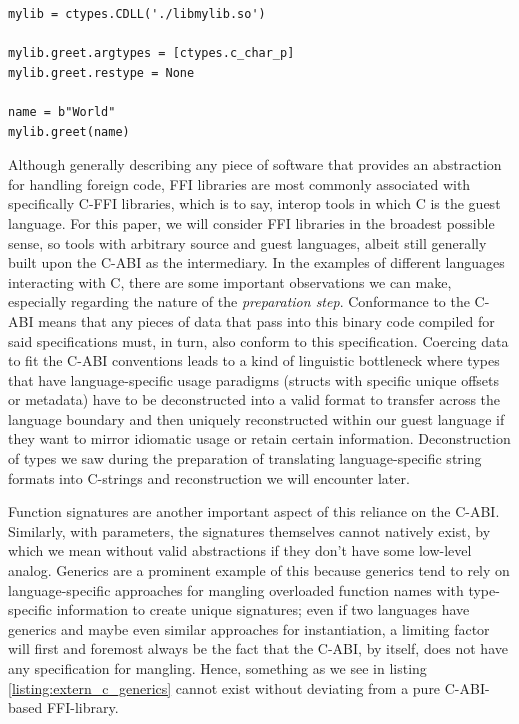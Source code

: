 \begin{listing}[ht!]
\begin{verbatim}
mylib = ctypes.CDLL('./libmylib.so')

mylib.greet.argtypes = [ctypes.c_char_p]
mylib.greet.restype = None

name = b"World"
mylib.greet(name)
\end{verbatim}
  \caption{FFI Example in Python using the cffi library}
  \label{listing:ffi_example_python}
\end{listing}

Although generally describing any piece of software that provides an abstraction for handling foreign code, FFI libraries are most commonly associated with specifically C-FFI libraries, which is to say, interop tools in which C is the guest language. For this paper, we will consider FFI libraries in the broadest possible sense, so tools with arbitrary source and guest languages, albeit still generally built upon the C-ABI as the intermediary. In the examples of different languages interacting with C, there are some important observations we can make, especially regarding the nature of the \textit{preparation step}. Conformance to the C-ABI means that any pieces of data that pass into this binary code compiled for said specifications must, in turn, also conform to this specification. Coercing data to fit the C-ABI conventions leads to a kind of linguistic bottleneck where types that have language-specific usage paradigms (\ie structs with specific unique offsets or metadata) have to be deconstructed into a valid format to transfer across the language boundary and then uniquely reconstructed within our guest language if they want to mirror idiomatic usage or retain certain information. Deconstruction of types we saw during the preparation of translating language-specific string formats into C-strings and reconstruction we will encounter later. 

Function signatures are another important aspect of this reliance on the C-ABI. Similarly, with parameters, the signatures themselves cannot natively exist, by which we mean without valid abstractions if they don't have some low-level analog. Generics are a prominent example of this because generics tend to rely on language-specific approaches for mangling overloaded function names with type-specific information to create unique signatures; even if two languages have generics and maybe even similar approaches for instantiation, a limiting factor will first and foremost always be the fact that the C-ABI, by itself, does not have any specification for mangling. Hence, something as we see in listing \ref{listing:extern_c_generics} cannot exist without deviating from a pure C-ABI-based FFI-library.    

